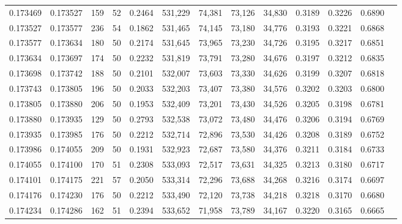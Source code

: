 \begin{tabular}{rrrrrrrrrrrrr}
0.173469 & 0.173527 &   159 &  52 &                                     0.2464 & 531,229 &  74,381 &  73,126 &  34,830 & 0.3189 & 0.3226 & 0.6890 \\
0.173527 & 0.173577 &   236 &  54 &                                     0.1862 & 531,465 &  74,145 &  73,180 &  34,776 & 0.3193 & 0.3221 & 0.6868 \\
0.173577 & 0.173634 &   180 &  50 &                                     0.2174 & 531,645 &  73,965 &  73,230 &  34,726 & 0.3195 & 0.3217 & 0.6851 \\
0.173634 & 0.173697 &   174 &  50 &                                     0.2232 & 531,819 &  73,791 &  73,280 &  34,676 & 0.3197 & 0.3212 & 0.6835 \\
0.173698 & 0.173742 &   188 &  50 &                                     0.2101 & 532,007 &  73,603 &  73,330 &  34,626 & 0.3199 & 0.3207 & 0.6818 \\
0.173743 & 0.173805 &   196 &  50 &                                     0.2033 & 532,203 &  73,407 &  73,380 &  34,576 & 0.3202 & 0.3203 & 0.6800 \\
0.173805 & 0.173880 &   206 &  50 &                                     0.1953 & 532,409 &  73,201 &  73,430 &  34,526 & 0.3205 & 0.3198 & 0.6781 \\
0.173880 & 0.173935 &   129 &  50 &                                     0.2793 & 532,538 &  73,072 &  73,480 &  34,476 & 0.3206 & 0.3194 & 0.6769 \\
0.173935 & 0.173985 &   176 &  50 &                                     0.2212 & 532,714 &  72,896 &  73,530 &  34,426 & 0.3208 & 0.3189 & 0.6752 \\
0.173986 & 0.174055 &   209 &  50 &                                     0.1931 & 532,923 &  72,687 &  73,580 &  34,376 & 0.3211 & 0.3184 & 0.6733 \\
0.174055 & 0.174100 &   170 &  51 &                                     0.2308 & 533,093 &  72,517 &  73,631 &  34,325 & 0.3213 & 0.3180 & 0.6717 \\
0.174101 & 0.174175 &   221 &  57 &                                     0.2050 & 533,314 &  72,296 &  73,688 &  34,268 & 0.3216 & 0.3174 & 0.6697 \\
0.174176 & 0.174230 &   176 &  50 &                                     0.2212 & 533,490 &  72,120 &  73,738 &  34,218 & 0.3218 & 0.3170 & 0.6680 \\
0.174234 & 0.174286 &   162 &  51 &                                     0.2394 & 533,652 &  71,958 &  73,789 &  34,167 & 0.3220 & 0.3165 & 0.6665 \\

\end{tabular}
